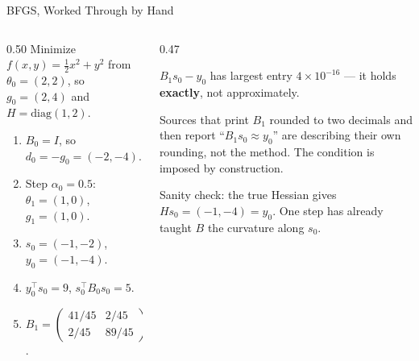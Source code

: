 \begin{frame}{BFGS, Worked Through by Hand}
\begin{columns}[T]
\begin{column}{0.50\textwidth}
\small
Minimize $f(x,y)=\tfrac12x^{2}+y^{2}$ from $\theta_0=(2,2)$, so $g_0=(2,4)$ and $H=\mathrm{diag}(1,2)$.
\medskip
\begin{enumerate}\footnotesize
  \item $B_0=I$, so $d_0=-g_0=(-2,-4)$.
  \item Step $\alpha_0=0.5$: \;$\theta_1=(1,0)$, \;$g_1=(1,0)$.
  \item $s_0=(-1,-2)$, \;$y_0=(-1,-4)$.
  \item $y_0^{\!\top}s_0=9$, \;$s_0^{\!\top}B_0s_0=5$.
  \item $B_1=\begin{pmatrix}41/45 & 2/45\\[1pt] 2/45 & 89/45\end{pmatrix}
        =\begin{pmatrix}0.911 & 0.044\\[1pt] 0.044 & 1.978\end{pmatrix}$.
\end{enumerate}
\end{column}
\begin{column}{0.47\textwidth}
\begin{takeawaybox}[title=\textbf{Check the secant condition}]\small
$B_1s_0-y_0$ has largest entry $4\times10^{-16}$ --- it holds \textbf{exactly}, not approximately.
\end{takeawaybox}
\medskip
\begin{cautionbox}\footnotesize
Sources that print $B_1$ rounded to two decimals and then report ``$B_1s_0\approx y_0$'' are describing their own rounding, not the method. The condition is imposed by construction.
\end{cautionbox}
\medskip
\begin{examplebox}\footnotesize
Sanity check: the true Hessian gives $Hs_0=(-1,-4)=y_0$. One step has already taught $B$ the curvature along $s_0$.
\end{examplebox}
\end{column}
\end{columns}
\vspace{1mm}
\end{frame}

